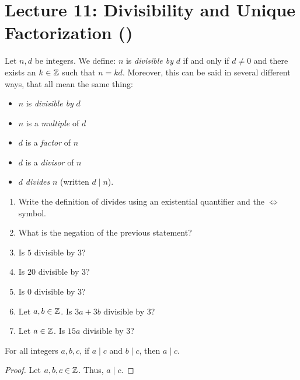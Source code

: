 \section*{Lecture 11: Divisibility and Unique Factorization ()}

\begin{definition}[Divides]
    Let $n,d$ be integers.  We define: $n$ is \emph{divisible by} $d$
    if and only if
    $d \neq 0$ and there exists an $k \in {\mathbb Z}$ such
    that $n=kd$.  Moreover, this can be said in several different ways, that all
    mean the same thing:
    \begin{itemize}
        \item $n$ is \emph{divisible by} $d$
        \item $n$ is a \emph{multiple} of $d$
        \item $d$ is a \emph{factor} of $n$
        \item $d$ is a \emph{divisor} of $n$
        \item $d$ \emph{divides} $n$ (written $d \mid n$).
    \end{itemize}
\end{definition}



\begin{enumerate}
    \item Write the definition of divides using an existential quantifier and
        the $\iff$ symbol.
       \practice
    \item What is the negation of the previous statement?
       \practice
    \item Is $5$ divisible by $3$?
       \practice
    \pagebreak
    \item Is $20$ divisible by $3$?
       \practice
    \item Is $0$ divisible by $3$?
       \practice
    \item Let $a,b \in {\mathbb Z}$. Is $3a+3b$ divisible by $3$?
       \practice
    \item Let $a \in {\mathbb Z}$. Is $15a$ divisible by $3$?
       \practice
\end{enumerate}


\pagebreak

\begin{theorem}
    For all integers $a,b,c$, if $a \mid c$ and $b \mid c$, then $a \mid c$.
\end{theorem}
\begin{proof}
    Let $a,b,c \in {\mathbb Z}$.
    \proofspace
    Thus, $a \mid c$.
\end{proof}

